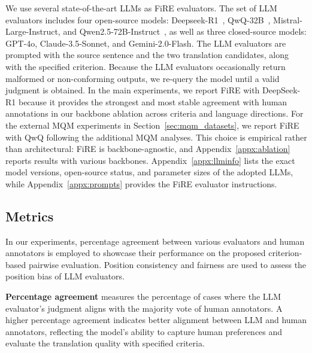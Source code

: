 \documentclass{article}
\theoremstyle{plain}
\theoremstyle{definition}
\theoremstyle{remark}
\newcommand{\ours}{FiRE }
\begin{document}
We use several state-of-the-art LLMs as \ours evaluators. The set of LLM evaluators includes four open-source models: Deepseek-R1~\citep{deepseekai2025deepseekr1incentivizingreasoningcapability}, QwQ-32B~\citep{qwq32b}, Mistral-Large-Instruct, and Qwen2.5-72B-Instruct~\citep{qwen2.5}, as well as three closed-source models: GPT-4o, Claude-3.5-Sonnet, and Gemini-2.0-Flash. 
The LLM evaluators are prompted with the source sentence and the two translation candidates, along with the specified criterion. Because the LLM evaluators occasionally return malformed or non-conforming outputs, we re-query the model until a valid judgment is obtained. In the main experiments, we report \ours with DeepSeek-R1 because it provides the strongest and most stable agreement with human annotations in our backbone ablation across criteria and language directions. For the external MQM experiments in Section~\ref{sec:mqm_datasets}, we report \ours with QwQ following the additional MQM analyses. This choice is empirical rather than architectural: \ours is backbone-agnostic, and Appendix~\ref{appx:ablation} reports results with various backbones. Appendix~\ref{appx:llminfo} lists the exact model versions, open-source status, and parameter sizes of the adopted LLMs, while Appendix~\ref{appx:prompts} provides the \ours evaluator instructions.

\subsection{Metrics}
\label{sec:metrics}
In our experiments, percentage agreement between various evaluators and human annotators is employed to showcase their performance on the proposed criterion-based pairwise evaluation. Position consistency and fairness are used to assess the position bias of LLM evaluators.

\textbf{Percentage agreement} measures the percentage of cases where the LLM evaluator's judgment aligns with the majority vote of human annotators. A higher percentage agreement indicates better alignment between LLM 
and human annotators, reflecting the model's ability to capture human preferences and evaluate the translation quality with specified criteria.
\end{document}
